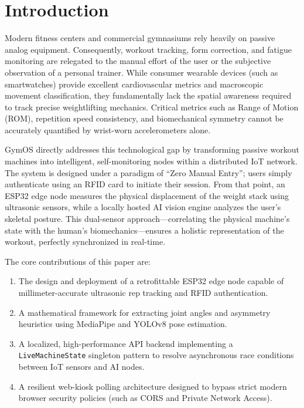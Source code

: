 \documentclass[conference]{IEEEtran}
\begin{document}
\section{Introduction}
Modern fitness centers and commercial gymnasiums rely heavily on passive analog equipment. Consequently, workout tracking, form correction, and fatigue monitoring are relegated to the manual effort of the user or the subjective observation of a personal trainer. While consumer wearable devices (such as smartwatches) provide excellent cardiovascular metrics and macroscopic movement classification, they fundamentally lack the spatial awareness required to track precise weightlifting mechanics. Critical metrics such as Range of Motion (ROM), repetition speed consistency, and biomechanical symmetry cannot be accurately quantified by wrist-worn accelerometers alone.

GymOS directly addresses this technological gap by transforming passive workout machines into intelligent, self-monitoring nodes within a distributed IoT network. The system is designed under a paradigm of ``Zero Manual Entry''; users simply authenticate using an RFID card to initiate their session. From that point, an ESP32 edge node measures the physical displacement of the weight stack using ultrasonic sensors, while a locally hosted AI vision engine analyzes the user's skeletal posture. This dual-sensor approach—correlating the physical machine's state with the human's biomechanics—ensures a holistic representation of the workout, perfectly synchronized in real-time.

The core contributions of this paper are:
\begin{enumerate}
    \item The design and deployment of a retrofittable ESP32 edge node capable of millimeter-accurate ultrasonic rep tracking and RFID authentication.
    \item A mathematical framework for extracting joint angles and asymmetry heuristics using MediaPipe and YOLOv8 pose estimation.
    \item A localized, high-performance API backend implementing a \texttt{LiveMachineState} singleton pattern to resolve asynchronous race conditions between IoT sensors and AI nodes.
    \item A resilient web-kiosk polling architecture designed to bypass strict modern browser security policies (such as CORS and Private Network Access).
\end{enumerate}

\end{document}
